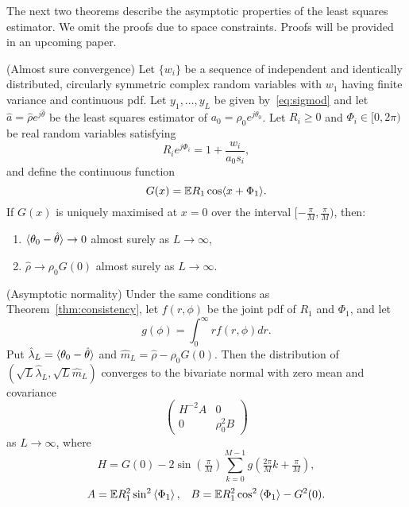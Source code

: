 \documentclass{article}
\begin{document}
The next two theorems describe the asymptotic properties of the least squares estimator.  We omit the proofs due to space constraints.  Proofs will be provided in an upcoming paper.

\begin{theorem}\label{thm:consistency} (Almost sure convergence)
Let $\{w_i\}$ be a sequence of independent and identically distributed, circularly symmetric complex random variables with $w_1$ having finite variance and continuous pdf.  Let $y_1,\dots, y_L$ be given by~\eqref{eq:sigmod} and let $\hat{a} = \hat{\rho}e^{j\hat{\theta}}$ be the least squares estimator of $a_0 = \rho_0e^{j\theta_0}$.  Let $R_i \geq 0$ and $\Phi_i \in [0,2\pi)$ be real random variables satisfying
\[
R_ie^{j\Phi_i} = 1 + \frac{w_i}{a_0 s_i},
\]
and define the continuous function
\[
G(x) = {\mathbb E} R_1 \cos\langle  x + \Phi_1 \rangle.
\] 
If $G(x)$ is uniquely maximised at $x = 0$ over the interval $[-\tfrac{\pi}{M},\tfrac{\pi}{M})$, then:
\begin{enumerate}
\item $\langle \theta_0 - \hat{\theta} \rangle \rightarrow 0$ almost surely as $L \rightarrow \infty$,
\item $\hat{\rho} \rightarrow \rho_0 G(0)$ almost surely as $L \rightarrow \infty$.
\end{enumerate}
\end{theorem}

\begin{theorem}\label{thm:normality} (Asymptotic normality)
Under the same conditions as Theorem~\ref{thm:consistency}, let $f(r,\phi)$ be the joint pdf of $R_1$ and $\Phi_1$, and let
\[
g(\phi) = \int_{0}^{\infty} r f(r,\phi) dr.
\]
Put $\hat{\lambda}_L = \langle \theta_0 - \hat{\theta} \rangle$ and $\hat{m}_L = \hat{\rho} - \rho_0 G(0)$. %
Then the distribution of $(\sqrt{L}\hat{\lambda}_L, \sqrt{L}\hat{m}_L)$ converges to the bivariate normal with zero mean and covariance
\[
\left( \begin{array}{cc} 
H^{-2} A & 0 \\
0 & \rho_0^2 B
\end{array} \right)
\]
as $L \rightarrow \infty$, where
\[
H = G(0) -  2 \sin(\tfrac{\pi}{M}) \sum_{k = 0}^{M-1} g(\tfrac{2\pi}{M}k + \tfrac{\pi}{M}),
\]
\[
A = {\mathbb E} R_1^2\sin^2\left\langle \Phi_1 \right\rangle, \;\;\; B = {\mathbb E} R_1^2 \cos^2\left\langle \Phi_1 \right\rangle - G^2(0). 
\]
\end{theorem}
\end{document}
